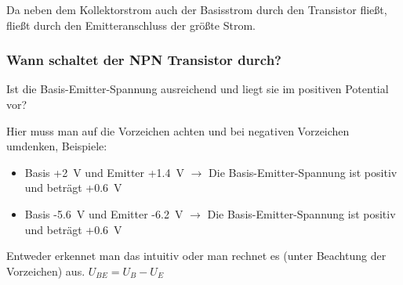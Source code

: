 \begin{frame}
\end{frame}

\begin{frame}Da neben dem Kollektorstrom auch der Basisstrom durch den Transistor fließt, fließt durch den Emitteranschluss der größte Strom.

\end{frame}

\begin{frame}
\end{frame}

\begin{frame}
\frametitle{Wann schaltet der NPN Transistor durch?}
Ist die Basis-Emitter-Spannung ausreichend und liegt sie im positiven Potential vor?

Hier muss man auf die Vorzeichen achten und bei negativen Vorzeichen umdenken, Beispiele:
    

\begin{itemize}
  \item Basis +\qty{2}{\volt} und Emitter +\qty{1,4}{\volt} $\rightarrow$ Die Basis-Emitter-Spannung ist positiv und beträgt +\qty{0,6}{\volt}
  \item Basis -\qty{5,6}{\volt} und Emitter -\qty{6,2}{\volt} $\rightarrow$ Die Basis-Emitter-Spannung ist positiv und beträgt +\qty{0,6}{\volt}
  \end{itemize}

Entweder erkennet man das intuitiv oder man rechnet es (unter Beachtung der Vorzeichen) aus.
    $U_{ BE } = U_{ B } - U_{ E }$
\end{frame}


